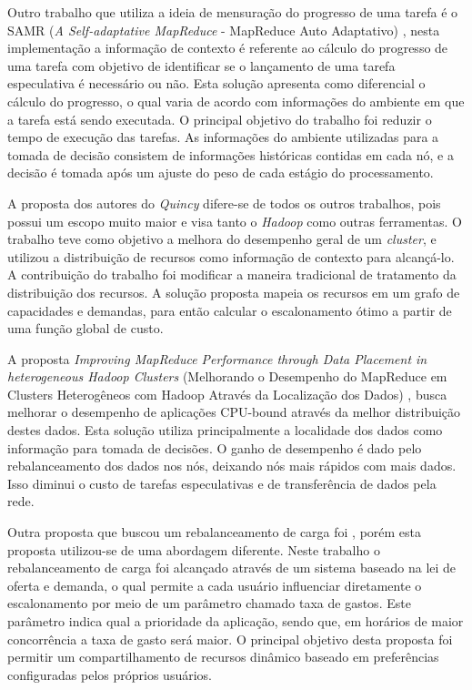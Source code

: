 Outro trabalho que utiliza a ideia de mensuração do progresso de uma tarefa é o SAMR (\textit{A Self-adaptative MapReduce} - MapReduce Auto Adaptativo) \cite{SAMR}, nesta implementação a informação de contexto é referente ao cálculo do progresso de uma tarefa com objetivo de identificar se o lançamento de uma tarefa especulativa é necessário ou não. Esta solução apresenta como diferencial o cálculo do progresso, o qual varia de acordo com informações do ambiente em que a tarefa está sendo executada. O principal objetivo do trabalho foi reduzir o tempo de execução das tarefas. As informações do ambiente utilizadas para a tomada de decisão consistem de informações históricas contidas em cada nó, e a decisão é tomada após um ajuste do peso de cada estágio do processamento.


A proposta dos autores do \textit{Quincy} \cite{Quincy} difere-se de todos os outros trabalhos, pois possui um escopo muito maior e visa tanto o \textit{Hadoop} como outras ferramentas. O trabalho teve como objetivo a melhora do desempenho geral de um \textit{cluster}, e utilizou a distribuição de recursos como informação de contexto para alcançá-lo. A contribuição do trabalho foi modificar a maneira tradicional de tratamento da distribuição dos recursos. A solução proposta mapeia os recursos em um grafo de capacidades e demandas, para então calcular o escalonamento ótimo a partir de uma função global de custo.

A proposta \textit{Improving MapReduce Performance through Data Placement in heterogeneous Hadoop Clusters} (Melhorando o Desempenho do MapReduce em Clusters Heterogêneos com Hadoop Através da Localização dos Dados) \cite{IMRPDPHHC}, busca melhorar o desempenho de aplicações CPU-bound através da melhor distribuição destes dados. Esta solução utiliza principalmente a localidade dos dados como informação para tomada de decisões. O ganho de desempenho é dado pelo rebalanceamento dos dados nos nós, deixando nós mais rápidos com mais dados. Isso diminui o custo de tarefas especulativas e de transferência de dados pela rede.

Outra proposta que buscou um rebalanceamento de carga foi \cite{Sandholm2009}, porém esta proposta utilizou-se de uma abordagem diferente. Neste trabalho o rebalanceamento de carga foi alcançado através de um sistema baseado na lei de oferta e demanda, o qual permite a cada usuário influenciar diretamente o escalonamento por meio de um parâmetro chamado taxa de gastos. Este parâmetro indica qual a prioridade da aplicação, sendo que, em horários de maior concorrência a taxa de gasto será maior. O principal objetivo desta proposta foi permitir um compartilhamento de recursos dinâmico baseado em preferências configuradas pelos próprios usuários.

